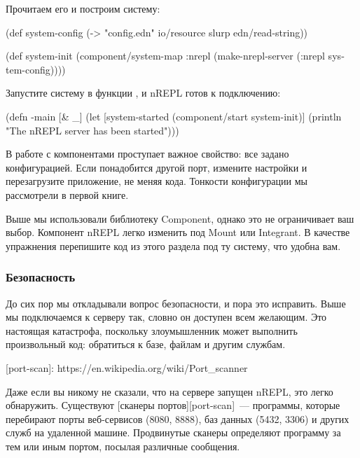 Прочитаем его и построим систему:

\begin{english}
  \begin{clojure}
(def system-config
  (-> "config.edn"
      io/resource
      slurp
      edn/read-string))

(def system-init
  (component/system-map
   :nrepl (make-nrepl-server (:nrepl system-config))))
  \end{clojure}
\end{english}

Запустите систему в функции  , и nREPL готов к подключению:

\begin{english}
  \begin{clojure}
(defn -main
  [& _]
  (let [system-started
        (component/start system-init)]
    (println "The nREPL server has been started")))
  \end{clojure}
\end{english}

В работе с компонентами проступает важное свойство: все задано конфигурацией. Если понадобится другой порт, измените настройки и перезагрузите приложение, не меняя кода. Тонкости конфигурации мы рассмотрели в первой книге.

Выше мы использовали библиотеку Component, однако это не ограничивает ваш выбор. Компонент nREPL легко изменить под Mount или Integrant. В качестве упражнения перепишите код из этого раздела под ту систему, что удобна вам.

\subsubsection{Безопасность}

До сих пор мы откладывали вопрос безопасности, и пора это исправить. Выше мы подключаемся к серверу так, словно он доступен всем желающим. Это настоящая катастрофа, поскольку злоумышленник может выполнить произвольный код: обратиться к базе, файлам и другим службам.

[port-scan]: https://en.wikipedia.org/wiki/Port\_scanner

Даже если вы никому не сказали, что на сервере запущен nREPL, это легко обнаружить. Существуют [сканеры портов][port-scan]~--- программы, которые перебирают порты веб-сервисов (8080, 8888), баз данных (5432, 3306) и других служб на удаленной машине. Продвинутые сканеры определяют программу за тем или иным портом, посылая различные сообщения.

